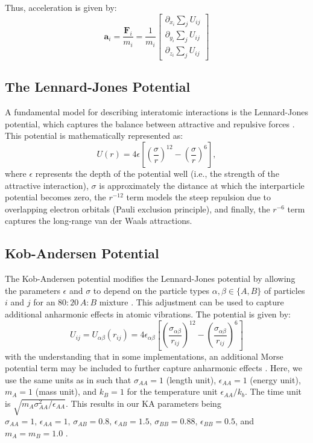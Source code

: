 \documentclass{article}
\begin{document}
Thus, acceleration is given by:
\begin{equation} \label{eq:acceleration}
    \mathbf{a}_i = \frac{\mathbf{F}_i}{m_i} =\frac{1}{m_i}\begin{bmatrix}
        \partial_{x_i}\sum_j U_{ij} \\
        \partial_{y_i}\sum_j U_{ij} \\
        \partial_{z_i}\sum_{j} U_{ij}
    \end{bmatrix}
\end{equation}

\subsection{The Lennard-Jones Potential}
A fundamental model for describing interatomic interactions is the Lennard-Jones potential, which captures the balance between 
attractive and repulsive forces \cite{vollmayr2020introduction}. This potential is mathematically represented as:
\begin{equation}\label{eq:LJ}
    U(r) = 4\epsilon \left[ \left(\frac{\sigma}{r}\right)^{12} - \left(\frac{\sigma}{r}\right)^{6} \right],
\end{equation}
where \(\epsilon\) represents the depth of the potential well (i.e., the strength of the attractive interaction),
\(\sigma\) is approximately the distance at which the interparticle potential becomes zero,
the \(r^{-12}\) term models the steep repulsion due to overlapping electron orbitals (Pauli exclusion principle),
and finally, the \(r^{-6}\) term captures the long-range van der Waals attractions.

\subsection{Kob-Andersen Potential}
The Kob-Andersen potential modifies the Lennard-Jones potential by allowing the parameters \(\epsilon\) and \(\sigma\) to depend on the particle types \(\alpha,\beta \in \{A,B\}\) of 
particles \(i\) and \(j\) for an \(80:20 \, A:B\) mixture \cite{vollmayr2020introduction}. This adjustment can be used to capture additional anharmonic effects in atomic vibrations. The potential is given by:
\begin{equation}\label{eq:KA}
    U_{ij} = U_{\alpha\beta}(r_{ij}) = 4\epsilon_{\alpha\beta} \left[ \left(\frac{\sigma_{\alpha\beta}}{r_{ij}}\right)^{12} - \left(\frac{\sigma_{\alpha\beta}}{r_{ij}}\right)^{6} \right]
\end{equation}
with the understanding that in some implementations, an additional Morse potential term may be included to further capture anharmonic effects \cite{kob1994scaling}.
Here, we use the same units as in \cite{vollmayr2020introduction} such that \(\sigma_{AA} = 1\) (length unit), \(\epsilon_{AA}=1\) (energy unit), \(m_A = 1\) (mass unit), and 
\(k_B=1\) for the temperature unit \(\epsilon_{AA}/k_b\). The time unit is \(\sqrt{m_A \sigma^2_{AA}/\epsilon_{AA}}\).
This results in our KA parameters being \(\sigma_{AA}=1,\, \epsilon_{AA}=1,\, \sigma_{AB}=0.8,\, \epsilon_{AB}=1.5,\, \sigma_{BB}=0.88,\, \epsilon_{BB}=0.5\), and 
\(m_A = m_B = 1.0\) \cite{vollmayr2020introduction, kob1994scaling}.
\end{document}
